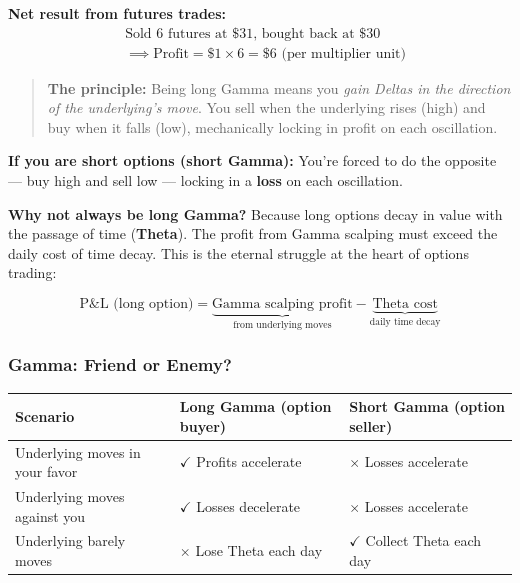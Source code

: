 \documentclass[12pt,openany]{book}
\begin{document}
\textbf{Net result from futures trades:}
\[
\begin{aligned}
&\text{Sold 6 futures at \$31, bought back at \$30} \\
&\implies \text{Profit} = \$1 \times 6 = \$6 \text{ (per multiplier unit)}
\end{aligned}
\]

\begin{quote}
\textbf{The principle:} Being long Gamma means you \emph{gain Deltas in the direction of the underlying's move}. You sell when the underlying rises (high) and buy when it falls (low), mechanically locking in profit on each oscillation.
\end{quote}

\textbf{If you are short options (short Gamma):} You're forced to do the opposite — buy high and sell low — locking in a \textbf{loss} on each oscillation.

\textbf{Why not always be long Gamma?}
Because long options decay in value with the passage of time (\textbf{Theta}). The profit from Gamma scalping must exceed the daily cost of time decay. This is the eternal struggle at the heart of options trading:

\[
\boxed{\text{P\&L (long option)} = \underbrace{\text{Gamma scalping profit}}_{\text{from underlying moves}} - \underbrace{\text{Theta cost}}_{\text{daily time decay}}}
\]

\subsubsection{Gamma: Friend or Enemy?}

\begin{center}
\scriptsize
\setlength{\tabcolsep}{3pt}
\begin{tabular}{|L{4.1cm}|L{4.1cm}|L{4.1cm}|}
\hline
\textbf{Scenario} & \textbf{Long Gamma (option buyer)} & \textbf{Short Gamma (option seller)} \\
\hline
Underlying moves in your favor & \(\checkmark\) Profits accelerate & \(\times\) Losses accelerate \\
\hline
Underlying moves against you & \(\checkmark\) Losses decelerate & \(\times\) Losses accelerate \\
\hline
Underlying barely moves & \(\times\) Lose Theta each day & \(\checkmark\) Collect Theta each day \\
\hline
\end{tabular}
\end{center}
\end{document}
